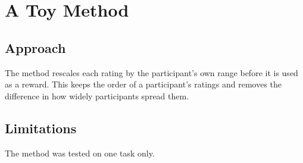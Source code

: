 \chapter{A Toy Method}
\label{ch:method}

\section{Approach}

The method rescales each rating by the participant's own range before it is used
as a reward. This keeps the order of a participant's ratings and removes the
difference in how widely participants spread them.

\section{Limitations}

The method was tested on one task only.

